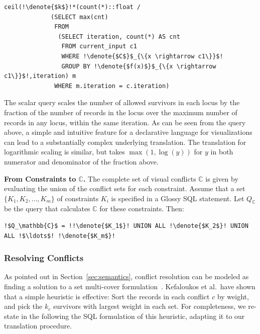 \documentclass[11pt, oneside]{report}
\newcommand{\minisec}[1]{\noindent\textbf{#1.}}
\newcommand{\denote}[1]{\text{$[\![ $#1$ ]\!]$}}
\begin{document}
{\begin{lstlisting}[mathescape,escapechar=!]
  ceil(!\denote{$k$}!*(count(*)::float / 
             (SELECT max(cnt)
              FROM 
               (SELECT iteration, count(*) AS cnt 
                FROM current_input c1
                WHERE !\denote{$C$}$_{\{x \rightarrow c1\}}$!
                GROUP BY !\denote{$f(x)$}$_{\{x \rightarrow c1\}}$!,iteration) m              
              WHERE m.iteration = c.iteration)           
\end{lstlisting} 


The scalar query scales the number of allowed survivors in each locus by the fraction of the number of records in the locus over the maximum number of records in any locus, within the same iteration. As can be seen from the query above, a simple and intuitive feature for a declarative language for visualizations can lead to a substantially complex underlying translation. The translation for logarithmic scaling is similar, but takes $\max(1,\log(y))$ for $y$ in both numerator and denominator of the fraction above. 

\minisec{From Constraints to $\mathbb{C}$}
The complete set of visual conflicts $\mathbb{C}$ is given by evaluating the union of the conflict sets for each constraint. Assume that a set $\{K_1, K_2, \ldots, K_m\}$ of constraints $K_i$ is specified in a Glossy SQL statement. Let $Q_\mathbb{C}$ be the query that calculates $\mathbb{C}$ for these constraints. Then:

\begin{lstlisting}[escapechar=\!]  
   !$Q_\mathbb{C}$ = !!\denote{$K_1$}! UNION ALL !\denote{$K_2$}! UNION ALL !$\ldots$! !\denote{$K_m$}! 
\end{lstlisting} 

\subsubsection{Resolving Conflicts}
\label{sec:resolve:conflicts}  

As pointed out in Section~\ref{sec:semantics}, conflict resolution can be modeled as finding a solution to a set multi-cover formulation~\cite{KefaloukosSZ14:CVL}. Kefaloukos et al.~have shown that a simple heuristic is effective: Sort the records in each conflict $c$ by weight, and pick the $k_c$ survivors with largest weight in each set. For completeness, we re-state in the following the SQL formulation of this heuristic, adapting it to our translation procedure.

}
\end{document}
